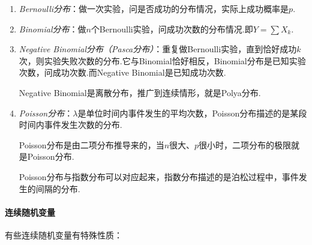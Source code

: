 \begin{enumerate}
	\item \emph{Bernoulli分布}：做一次实验，问是否成功的分布情况，实际上成功概率是$p$.
	\item \emph{Binomial分布}：做$n$个Bernoulli实验，问成功次数的分布情况.即$Y=\sum X_k$.
	\item \emph{Negative Binomial分布（Pasca分布）}：重复做Bernoulli实验，直到恰好成功$k$次，则实验失败次数的分布.它与Binomial恰好相反，Binomial分布是已知实验次数，问成功次数.而Negative Binomial是已知成功次数.
	
	Negative Binomial是离散分布，推广到连续情形，就是Polya分布.
	\item \emph{Poisson分布}：$\lambda$是单位时间内事件发生的平均次数，Poisson分布描述的是某段时间内事件发生次数的分布.
	
	Poisson分布是由二项分布推导来的，当$n$很大、$p$很小时，二项分布的极限就是Poisson分布.
	
	Poisson分布与指数分布可以对应起来，指数分布描述的是泊松过程中，事件发生的间隔的分布.
	
\end{enumerate}
\paragraph*{连续随机变量}有些连续随机变量有特殊性质：

